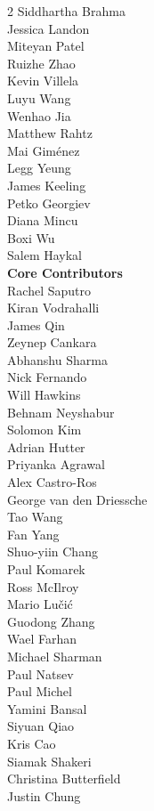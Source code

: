 \begin{multicols}{2}
Siddhartha Brahma \\
Jessica Landon \\
Miteyan Patel \\
Ruizhe Zhao \\
Kevin Villela \\
Luyu Wang \\
Wenhao Jia \\
Matthew Rahtz \\
Mai Giménez \\
Legg Yeung \\
James Keeling \\
Petko Georgiev \\
Diana Mincu \\
Boxi Wu \\
Salem Haykal \\
\noindent
\textbf{Core Contributors} \\
Rachel Saputro \\
Kiran Vodrahalli \\
James Qin \\
Zeynep Cankara \\
Abhanshu Sharma \\
Nick Fernando \\
Will Hawkins \\
Behnam Neyshabur \\
Solomon Kim \\
Adrian Hutter \\
Priyanka Agrawal \\
Alex Castro-Ros \\
George van den Driessche \\
Tao Wang \\
Fan Yang \\
Shuo-yiin Chang \\
Paul Komarek \\
Ross McIlroy \\
Mario Lučić \\
Guodong Zhang \\
Wael Farhan \\
Michael Sharman \\
Paul Natsev \\
Paul Michel \\
Yamini Bansal\\
Siyuan Qiao \\
Kris Cao \\
Siamak Shakeri \\
Christina Butterfield \\
Justin Chung \\

\end{multicols}
